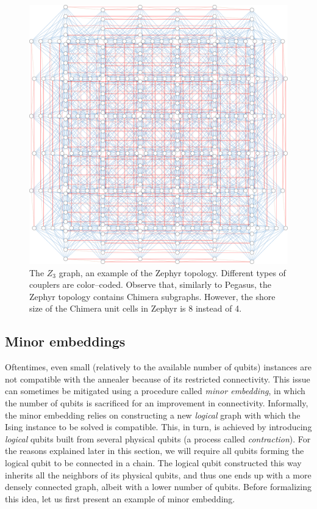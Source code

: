 \begin{figure}
    \includegraphics[width=\textwidth]{figures/zephyr}
    \caption{
        The $Z_3$ graph, an example of the Zephyr topology. Different types of couplers are
        color--coded. Observe that, similarly to Pegasus, the Zephyr topology contains Chimera
        subgraphs. However, the shore size of the Chimera unit cells in Zephyr is 8 instead of 4.
    }
    \label{fig:zephyr}
\end{figure}


\subsection{Minor embeddings}

Oftentimes, even small (relatively to the available number of qubits) instances are not compatible
with the annealer because of its restricted connectivity. This issue can sometimes be mitigated
using a procedure called \emph{minor embedding}, in which the number of qubits is sacrificed for an
improvement in connectivity. Informally, the minor embedding relies on constructing a new
\emph{logical} graph with which the Ising instance to be solved is compatible.
This, in turn, is achieved by introducing \emph{logical} qubits built from several physical qubits
(a process called \emph{contraction}). For the reasons explained later in this section, we will
require all qubits forming the logical qubit to be connected in a chain. The logical qubit
constructed this way inherits all the neighbors of its physical qubits, and thus one ends up with a
more densely connected graph, albeit with a lower number of qubits. Before formalizing this idea, let us first present an example of minor embedding.

